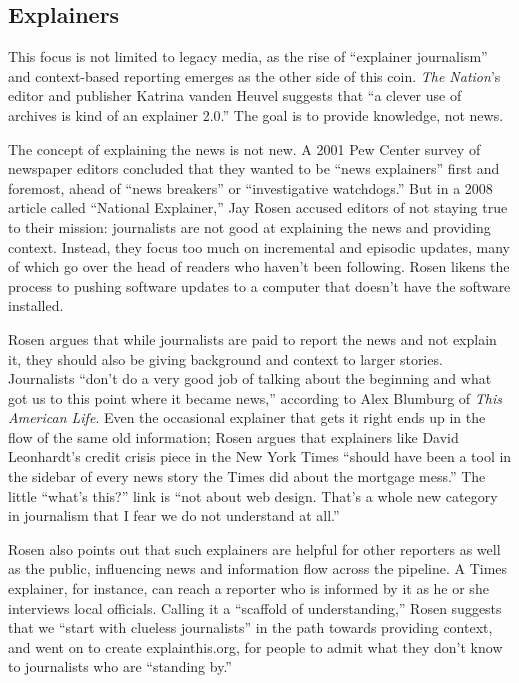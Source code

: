 \subsection{Explainers}

This focus is not limited to legacy media, as the rise of ``explainer journalism'' and context-based reporting emerges as the other side of this coin. \emph{The Nation}'s editor and publisher Katrina vanden Heuvel suggests that ``a clever use of archives is kind of an explainer 2.0.''\autocite{} The goal is to provide knowledge, not news.

The concept of explaining the news is not new. A 2001 Pew Center survey of newspaper editors concluded that they wanted to be ``news explainers'' first and foremost, ahead of ``news breakers'' or ``investigative watchdogs.'' But in a 2008 article called ``National Explainer,'' Jay Rosen accused editors of not staying true to their mission: journalists are not good at explaining the news and providing context. Instead, they focus too much on incremental and episodic updates, many of which go over the head of readers who haven't been following. Rosen likens the process to pushing software updates to a computer that doesn't have the software installed.

Rosen argues that while journalists are paid to report the news and not explain it, they should also be giving background and context to larger stories. Journalists ``don’t do a very good job of talking about the beginning and what got us to this point where it became news,'' according to Alex Blumburg of \emph{This American Life}. Even the occasional explainer that gets it right ends up in the flow of the same old information; Rosen argues that explainers like David Leonhardt's credit crisis piece in the New York Times ``should have been a tool in the sidebar of every news story the Times did about the mortgage mess.'' The little ``what's this?'' link is ``not about web design. That's a whole new category in journalism that I fear we do not understand at all.''

Rosen also points out that such explainers are helpful for other reporters as well as the public, influencing news and information flow across the pipeline. A Times explainer, for instance, can reach a reporter who is informed by it as he or she interviews local officials. Calling it a ``scaffold of understanding,'' Rosen suggests that we ``start with clueless journalists'' in the path towards providing context, and went on to create explainthis.org, for people to admit what they don't know to journalists who are ``standing by.''\autocite{rosen_2008}

